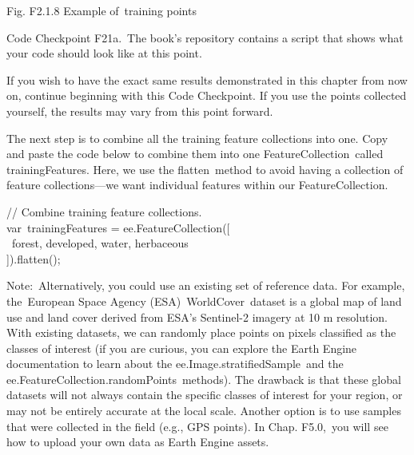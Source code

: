 \documentclass[
  letterpaper,
  DIV=11,
  numbers=noendperiod]{scrreprt}
\begin{document}
Fig. F2.1.8 Example of~training points

\begin{tcolorbox}[enhanced jigsaw, left=2mm, breakable, rightrule=.15mm, opacityback=0, colframe=quarto-callout-note-color-frame, colbacktitle=quarto-callout-note-color!10!white, arc=.35mm, opacitybacktitle=0.6, toptitle=1mm, colback=white, leftrule=.75mm, title=\textcolor{quarto-callout-note-color}{\faInfo}\hspace{0.5em}{Note}, toprule=.15mm, bottomtitle=1mm, titlerule=0mm, bottomrule=.15mm, coltitle=black]

Code Checkpoint F21a.~The book's repository contains a script that shows
what your code should look like at this point.

\end{tcolorbox}

If you wish to have the exact same results demonstrated in this chapter
from now on, continue beginning with this Code Checkpoint. If you use
the points collected yourself, the results may vary from this point
forward.

The next step is to combine all the training feature collections into
one. Copy and paste the code below to combine them into one
FeatureCollection~called trainingFeatures. Here, we use the
flatten~method to avoid having a collection of feature collections---we
want individual features within our FeatureCollection.

// Combine training feature collections.\\
var~trainingFeatures = ee.FeatureCollection({[}\\
\hspace*{0.333em} ~forest, developed, water, herbaceous\\
{]}).flatten();

Note:~Alternatively, you could use an existing set of reference data.
For example, the~European Space Agency (ESA)~WorldCover~dataset is a
global map of land use and land cover derived from ESA's Sentinel-2
imagery at 10 m resolution. With existing datasets, we can randomly
place points on pixels classified as the classes of interest (if you are
curious, you can explore the Earth Engine documentation to learn about
the ee.Image.stratifiedSample~and the
ee.FeatureCollection.randomPoints~methods). The drawback is that these
global datasets will not always contain the specific classes of interest
for your region, or may not be entirely accurate at the local scale.
Another option is to use samples that were collected in the field (e.g.,
GPS points). In Chap. F5.0,~you will see how to upload your own data as
Earth Engine assets.
\end{document}
